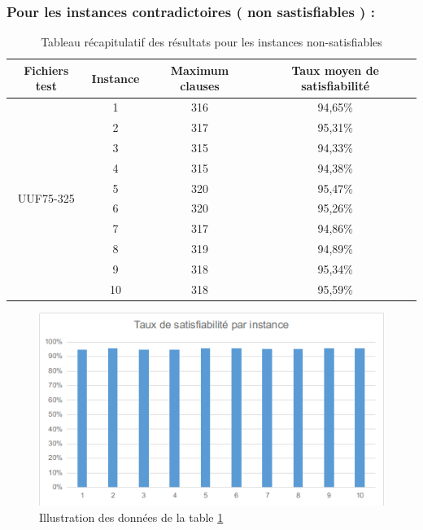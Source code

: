 \subsubsection{Pour les instances contradictoires ( non sastisfiables ) :  }
\begin{table}[H]
	\centering
\begin{tabular}{|c|c|c|c|}
	\hline
	Fichiers test               & Instance & Maximum clauses & Taux moyen de satisfiabilité \\ \hline
	\multirow{10}{*}{UUF75-325} & 1        & 316             & 94,65\%                      \\ \cline{2-4} 
	& 2        & 317             & 95,31\%                      \\ \cline{2-4} 
	& 3        & 315             & 94,33\%                      \\ \cline{2-4} 
	& 4        & 315             & 94,38\%                      \\ \cline{2-4} 
	& 5        & 320             & 95,47\%                      \\ \cline{2-4} 
	& 6        & 320             & 95,26\%                      \\ \cline{2-4} 
	& 7        & 317             & 94,86\%                      \\ \cline{2-4} 
	& 8        & 319             & 94,89\%                      \\ \cline{2-4} 
	& 9        & 318             & 95,34\%                      \\ \cline{2-4} 
	& 10       & 318             & 95,59\%                      \\ \hline
\end{tabular}
	\caption{Tableau récapitulatif des résultats pour les instances non-satisfiables}
	\label{table:Tab_Astar_Non_Sat}
\end{table}
\begin{figure}[H]
	\includegraphics[width=\textwidth]{images/AstarUUF75Graph.png}
	\caption{Illustration des données de la table \ref{table:Tab_Astar_Non_Sat}}
\end{figure}
\newpage
